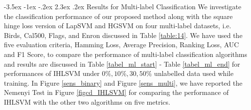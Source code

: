 \documentclass[12pt,a4paper,oneside,english]{report}
\makeatletter
\renewcommand\subsection{\@startsection {subsection}{1}{\z@}%
                                   {-3.5ex \@plus -1ex \@minus -.2ex}%
                                   {2.3ex \@plus.2ex}%
                                   {\centering\normalfont\Large\bfseries}}
\makeatother
\begin{document}
\subsection{Results for Multi-label Classification} We investigate the classification performance of our proposed method along with the square hinge loss version of LapSVM and HGSVM on four multi-label datasets, i.e. Birds, Cal500, Flags, and Enron discussed in  Table \ref{table:14}. We have used the five evaluation criteria, Hamming Loss, Average Precision, Ranking Loss, AUC and F1 Score,  to compare the performance of multi-label classification algorithms and results are discussed in Table \ref{tabel_ml_start} - Table \ref{tabel_ml_end} for performances of IHLSVM under \(0 \%, 10  \%, 30, 50 \%\) unlabelled data used while training. 
In Figure \ref{sens_binary} and Figure \ref{sens_multi}, we have reported the Nemenyi Test\cite{demvsar2006statistical} in Figure \ref{figcd_IHLSVM} for comparing the performance of IHLSVM with the other two algorithms on five metrics. 
\end{document}
